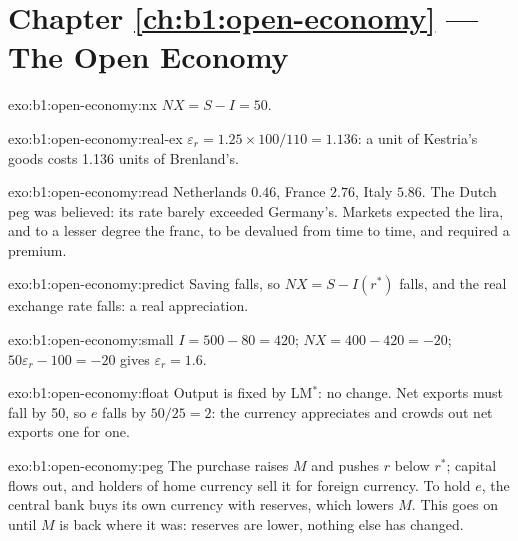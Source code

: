 \section*{Chapter \ref{ch:b1:open-economy} --- The Open Economy}

\begin{solution}{exo:b1:open-economy:nx}
$NX = S - I = 50$.
\end{solution}

\begin{solution}{exo:b1:open-economy:real-ex}
$\varepsilon_r = 1.25 \times 100/110 = 1.136$: a unit of Kestria's goods costs 1.136 units of Brenland's.
\end{solution}

\begin{solution}{exo:b1:open-economy:read}
Netherlands $0.46$, France $2.76$, Italy $5.86$. The Dutch peg was believed: its
rate barely exceeded Germany's. Markets expected the lira, and to a lesser
degree the franc, to be devalued from time to time, and required a premium.
\end{solution}

\begin{solution}{exo:b1:open-economy:predict}
Saving falls, so $NX = S - I(r^*)$ falls, and the real exchange rate falls: a real
appreciation.
\end{solution}

\begin{solution}{exo:b1:open-economy:small}
$I = 500 - 80 = 420$; $NX = 400 - 420 = -20$; $50\varepsilon_r - 100 = -20$ gives $\varepsilon_r = 1.6$.
\end{solution}

\begin{solution}{exo:b1:open-economy:float}
Output is fixed by LM$^*$: no change. Net exports must fall by 50, so $e$ falls by
$50/25 = 2$: the currency appreciates and crowds out net exports one for one.
\end{solution}

\begin{solution}{exo:b1:open-economy:peg}
The purchase raises $M$ and pushes $r$ below $r^*$; capital flows out, and holders of
home currency sell it for foreign currency. To hold $e$, the central bank buys
its own currency with reserves, which lowers $M$. This goes on until $M$ is back
where it was: reserves are lower, nothing else has changed.
\end{solution}


